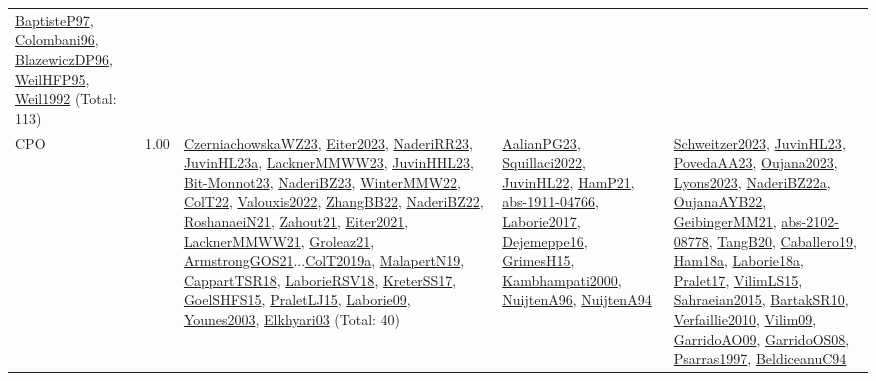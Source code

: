 {\begin{longtable}{p{3cm}r>{\raggedright\arraybackslash}p{6cm}>{\raggedright\arraybackslash}p{6cm}>{\raggedright\arraybackslash}p{8cm}}
\hyperref[detail:BaptisteP97]{BaptisteP97}, \hyperref[detail:Colombani96]{Colombani96}, \hyperref[detail:BlazewiczDP96]{BlazewiczDP96}, \hyperref[detail:WeilHFP95]{WeilHFP95}, \hyperref[detail:Weil1992]{Weil1992} (Total: 113)\\
\index{CPO}\index{CPSystems!CPO}CPO &  1.00 & \hyperref[detail:CzerniachowskaWZ23]{CzerniachowskaWZ23}, \hyperref[detail:Eiter2023]{Eiter2023}, \hyperref[detail:NaderiRR23]{NaderiRR23}, \hyperref[detail:JuvinHL23a]{JuvinHL23a}, \hyperref[detail:LacknerMMWW23]{LacknerMMWW23}, \hyperref[detail:JuvinHHL23]{JuvinHHL23}, \hyperref[detail:Bit-Monnot23]{Bit-Monnot23}, \hyperref[detail:NaderiBZ23]{NaderiBZ23}, \hyperref[detail:WinterMMW22]{WinterMMW22}, \hyperref[detail:ColT22]{ColT22}, \hyperref[detail:Valouxis2022]{Valouxis2022}, \hyperref[detail:ZhangBB22]{ZhangBB22}, \hyperref[detail:NaderiBZ22]{NaderiBZ22}, \hyperref[detail:RoshanaeiN21]{RoshanaeiN21}, \hyperref[detail:Zahout21]{Zahout21}, \hyperref[detail:Eiter2021]{Eiter2021}, \hyperref[detail:LacknerMMWW21]{LacknerMMWW21}, \hyperref[detail:Groleaz21]{Groleaz21}, \hyperref[detail:ArmstrongGOS21]{ArmstrongGOS21}...\hyperref[detail:ColT2019a]{ColT2019a}, \hyperref[detail:MalapertN19]{MalapertN19}, \hyperref[detail:CappartTSR18]{CappartTSR18}, \hyperref[detail:LaborieRSV18]{LaborieRSV18}, \hyperref[detail:KreterSS17]{KreterSS17}, \hyperref[detail:GoelSHFS15]{GoelSHFS15}, \hyperref[detail:PraletLJ15]{PraletLJ15}, \hyperref[detail:Laborie09]{Laborie09}, \hyperref[detail:Younes2003]{Younes2003}, \hyperref[detail:Elkhyari03]{Elkhyari03} (Total: 40) & \hyperref[detail:AalianPG23]{AalianPG23}, \hyperref[detail:Squillaci2022]{Squillaci2022}, \hyperref[detail:JuvinHL22]{JuvinHL22}, \hyperref[detail:HamP21]{HamP21}, \hyperref[detail:abs-1911-04766]{abs-1911-04766}, \hyperref[detail:Laborie2017]{Laborie2017}, \hyperref[detail:Dejemeppe16]{Dejemeppe16}, \hyperref[detail:GrimesH15]{GrimesH15}, \hyperref[detail:Kambhampati2000]{Kambhampati2000}, \hyperref[detail:NuijtenA96]{NuijtenA96}, \hyperref[detail:NuijtenA94]{NuijtenA94} & \hyperref[detail:Schweitzer2023]{Schweitzer2023}, \hyperref[detail:JuvinHL23]{JuvinHL23}, \hyperref[detail:PovedaAA23]{PovedaAA23}, \hyperref[detail:Oujana2023]{Oujana2023}, \hyperref[detail:Lyons2023]{Lyons2023}, \hyperref[detail:NaderiBZ22a]{NaderiBZ22a}, \hyperref[detail:OujanaAYB22]{OujanaAYB22}, \hyperref[detail:GeibingerMM21]{GeibingerMM21}, \hyperref[detail:abs-2102-08778]{abs-2102-08778}, \hyperref[detail:TangB20]{TangB20}, \hyperref[detail:Caballero19]{Caballero19}, \hyperref[detail:Ham18a]{Ham18a}, \hyperref[detail:Laborie18a]{Laborie18a}, \hyperref[detail:Pralet17]{Pralet17}, \hyperref[detail:VilimLS15]{VilimLS15}, \hyperref[detail:Sahraeian2015]{Sahraeian2015}, \hyperref[detail:BartakSR10]{BartakSR10}, \hyperref[detail:Verfaillie2010]{Verfaillie2010}, \hyperref[detail:Vilim09]{Vilim09}, \hyperref[detail:GarridoAO09]{GarridoAO09}, \hyperref[detail:GarridoOS08]{GarridoOS08}, \hyperref[detail:Psarras1997]{Psarras1997}, \hyperref[detail:BeldiceanuC94]{BeldiceanuC94}\\

\end{longtable}}
